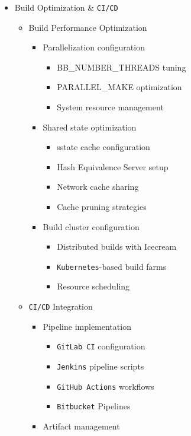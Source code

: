 \documentclass[
]{article}
\providecommand{\tightlist}{%
  \setlength{\itemsep}{0pt}\setlength{\parskip}{0pt}}
\begin{document}
\begin{itemize}
\tightlist
\item
  Build Optimization \& \texttt{CI/CD}

  \begin{itemize}
  \tightlist
  \item
    Build Performance Optimization

    \begin{itemize}
    \tightlist
    \item
      Parallelization configuration

      \begin{itemize}
      \tightlist
      \item
        BB\_NUMBER\_THREADS tuning
      \item
        PARALLEL\_MAKE optimization
      \item
        System resource management
      \end{itemize}
    \item
      Shared state optimization

      \begin{itemize}
      \tightlist
      \item
        sstate cache configuration
      \item
        Hash Equivalence Server setup
      \item
        Network cache sharing
      \item
        Cache pruning strategies
      \end{itemize}
    \item
      Build cluster configuration

      \begin{itemize}
      \tightlist
      \item
        Distributed builds with Icecream
      \item
        \texttt{Kubernetes}-based build farms
      \item
        Resource scheduling
      \end{itemize}
    \end{itemize}
  \item
    \texttt{CI/CD} Integration

    \begin{itemize}
    \tightlist
    \item
      Pipeline implementation

      \begin{itemize}
      \tightlist
      \item
        \texttt{GitLab\ CI} configuration
      \item
        \texttt{Jenkins} pipeline scripts
      \item
        \texttt{GitHub\ Actions} workflows
      \item
        \texttt{Bitbucket} Pipelines
      \end{itemize}
    \item
      Artifact management


\end{itemize}
\end{itemize}
\end{itemize}
\end{document}
